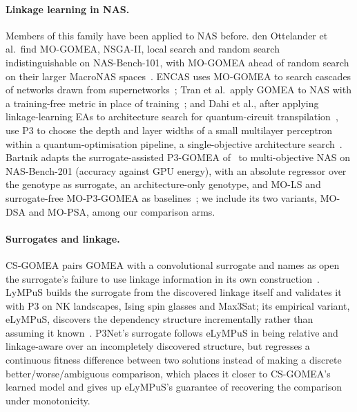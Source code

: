 \paragraph{Linkage learning in NAS.} Members of this family have been applied to NAS before. den Ottelander et al.\
find MO-GOMEA, NSGA-II, local search and random search indistinguishable on NAS-Bench-101, with MO-GOMEA ahead of
random search on their larger MacroNAS spaces~\citep{denottelander2021localsearch}. ENCAS uses MO-GOMEA to search
cascades of networks drawn from supernetworks~\citep{chebykin2022encas}; Tran et al.\ apply GOMEA to NAS with a
training-free metric in place of training~\citep{tran2023gomeanas}; and Dahi et al., after applying linkage-learning
EAs to architecture search for quantum-circuit transpilation~\citep{dahi2024evolutionary}, use P3 to choose the depth
and layer widths of a small multilayer perceptron within a quantum-optimisation pipeline, a single-objective
architecture search~\citep{dahi2026tightening}. Bartnik adapts the surrogate-assisted P3-GOMEA
of~\citet{dushatskiy2021novelsurrogateassistedevolutionaryalgorithm} to multi-objective NAS on NAS-Bench-201
(accuracy against GPU energy), with an absolute regressor over the genotype as surrogate, an architecture-only
genotype, and MO-LS and surrogate-free MO-P3-GOMEA as baselines~\citep{bartnik2026evolutionary}; we include its two
variants, MO-DSA and MO-PSA, among our comparison arms.

\paragraph{Surrogates and linkage.} CS-GOMEA pairs GOMEA with a convolutional surrogate and names as open the
surrogate's failure to use linkage information in its own construction~\citep{dushatskiy2019csgomea}. LyMPuS builds
the surrogate from the discovered linkage itself and validates it with P3 on NK landscapes, Ising spin glasses and
Max3Sat; its empirical variant, eLyMPuS, discovers the dependency structure incrementally rather than assuming it
known~\citep{przewozniczek2026lympus}. P3Net's surrogate follows eLyMPuS in being relative and
linkage-aware over an incompletely discovered structure, but regresses a continuous fitness difference between
two solutions instead of making a discrete better/worse/ambiguous comparison, which places it closer to CS-GOMEA's
learned model and gives up eLyMPuS's guarantee of recovering the comparison under monotonicity.

